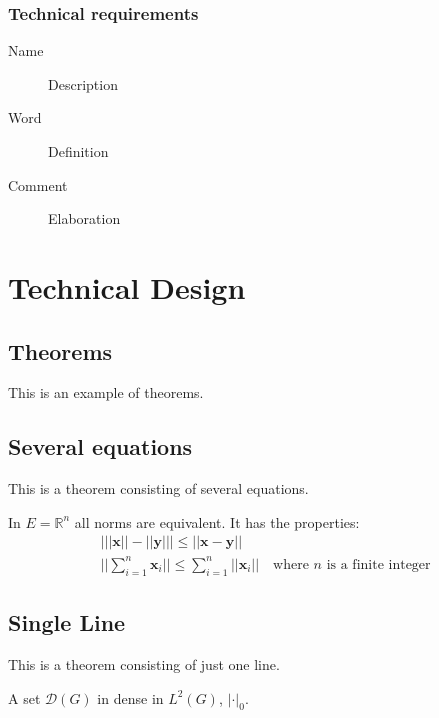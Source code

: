\documentclass[11pt,fleqn,,a4paper,twoside,openright]{book} %
\begin{document}
\subsection{Technical requirements}
\begin{description}
\item[Name] Description
\item[Word] Definition
\item[Comment] Elaboration
\end{description}


\chapter{Technical Design}

\section{Theorems}

This is an example of theorems.

\section{Several equations}
This is a theorem consisting of several equations.

\begin{theorem}
In $E=\mathbb{R}^n$ all norms are equivalent. It has the properties:
\begin{align}
& \big| ||\mathbf{x}|| - ||\mathbf{y}|| \big|\leq || \mathbf{x}- \mathbf{y}||\\
&  ||\sum_{i=1}^n\mathbf{x}_i||\leq \sum_{i=1}^n||\mathbf{x}_i||\quad\text{where $n$ is a finite integer}
\end{align}
\end{theorem}

\section{Single Line}
This is a theorem consisting of just one line.

\begin{theorem}
A set $\mathcal{D}(G)$ in dense in $L^2(G)$, $|\cdot|_0$. 
\end{theorem}
\end{document}
